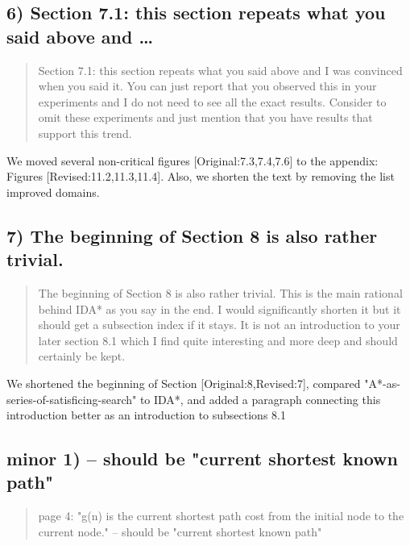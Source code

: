 \documentclass{article}
\begin{document}
\subsection{6) Section 7.1: this section repeats what you said above and \ldots{}}
\label{sec:orgheadline7}

\begin{quote}
Section 7.1: this section repeats what you said above and I was
convinced when you said it. You can just report that you observed this
in your experiments and I do not need to see all the exact results.
Consider to omit these experiments and just mention that you have
results that support this trend.
\end{quote}

We moved several non-critical figures [Original:7.3,7.4,7.6] to the appendix: Figures [Revised:11.2,11.3,11.4].
Also, we shorten the text by removing the list improved domains.

\subsection{7) The beginning of Section 8 is also rather trivial.}
\label{sec:orgheadline8}

\begin{quote}
The beginning of Section 8 is also rather trivial. This is the main
rational behind IDA* as you say in the end. I would significantly
shorten it but it should get a subsection index if it stays. It is not
an introduction to your later section 8.1 which I find quite
interesting and more deep and should certainly be kept.
\end{quote}

We shortened the beginning of Section [Original:8,Revised:7], compared "A*-as-series-of-satisficing-search" to IDA*, and added a paragraph connecting this introduction better as an introduction to  subsections 8.1



\subsection{minor 1) -- should be "current shortest known path"}
\label{sec:orgheadline9}

\begin{quote}
page 4: "g(n) is the current shortest path cost from the initial node
to the current node." -- should be "current shortest known path"
\end{quote}
\end{document}
